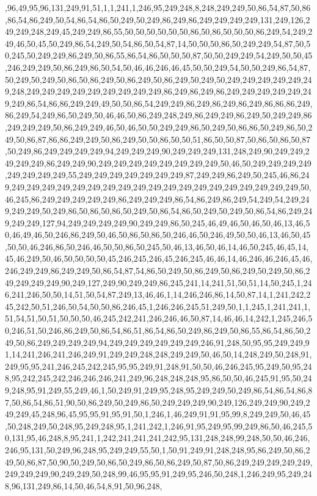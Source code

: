 ,96,49,95,96,131,249,91,51,1,1,241,1,246,95,249,248,8,248,249,249,50,86,54,87,50,86,86,54,86,249,50,54,86,54,86,50,249,50,249,86,249,86,249,249,249,249,131,249,126,249,249,248,249,45,249,249,86,55,50,50,50,50,50,50,86,50,86,50,50,50,86,249,54,249,249,46,50,45,50,249,86,54,249,50,54,86,50,54,87,14,50,50,50,86,50,249,249,54,87,50,50,245,50,249,249,86,249,50,86,55,86,54,86,50,50,50,87,50,50,249,249,54,249,50,50,45,246,249,249,50,86,249,86,50,54,50,46,46,246,46,45,50,50,249,54,50,50,249,86,54,87,50,249,50,249,50,86,50,86,249,50,86,249,50,86,249,50,249,50,249,249,249,249,249,249,248,249,249,249,249,249,249,249,249,249,86,249,86,249,86,249,249,249,249,249,249,249,86,54,86,86,249,249,49,50,50,86,54,249,249,86,249,86,249,86,249,86,86,86,249,86,249,54,249,86,50,249,50,46,46,50,86,249,248,249,86,249,249,86,249,50,249,249,86,249,249,249,50,86,249,249,46,50,46,50,50,249,249,86,50,249,50,86,86,50,249,86,50,249,50,86,87,86,86,249,249,50,86,249,50,50,86,50,50,51,86,50,50,87,50,86,50,86,50,87,50,249,86,249,249,249,249,94,249,249,249,90,249,249,249,131,248,249,90,249,249,249,249,249,86,249,249,90,249,249,249,249,249,249,249,249,50,46,50,249,249,249,249,249,249,249,249,55,249,249,249,249,249,249,249,87,249,249,86,249,50,245,46,86,249,249,249,249,249,249,249,249,249,249,249,249,249,249,249,249,249,249,249,249,50,46,245,86,249,249,249,249,249,86,249,249,249,86,54,86,249,86,249,54,249,54,249,249,249,249,50,249,86,50,86,50,86,50,249,50,86,54,86,50,249,50,249,50,86,54,86,249,249,249,249,127,94,249,249,249,249,90,249,249,86,50,245,46,49,46,50,46,50,46,13,46,50,46,49,46,50,246,86,249,50,46,50,86,50,86,50,246,46,50,246,49,50,50,46,13,46,50,45,50,50,46,246,86,50,246,46,50,50,86,50,245,50,46,13,46,50,46,14,46,50,245,46,45,14,45,46,249,50,46,50,50,50,50,45,246,245,246,45,246,245,46,46,14,46,246,46,246,45,46,246,249,249,86,249,249,50,86,54,87,54,86,50,249,50,86,249,50,86,249,50,249,50,86,249,249,249,249,90,249,127,249,90,249,249,86,245,241,14,241,51,50,51,14,50,245,1,246,241,246,50,50,14,51,50,54,87,249,13,46,46,1,14,246,246,86,14,50,87,14,1,241,242,245,242,50,51,246,50,54,50,50,86,246,45,1,246,246,245,51,249,50,1,1,245,1,241,241,1,51,54,51,50,51,50,50,50,46,245,242,241,246,246,46,50,87,14,46,46,14,242,1,245,246,50,246,51,50,246,86,249,50,86,54,86,51,86,54,86,50,249,86,249,50,86,55,86,54,86,50,249,50,86,249,249,249,249,94,249,249,249,249,249,249,246,91,248,50,95,95,249,249,91,14,241,246,241,246,249,91,249,249,248,248,249,249,50,46,50,14,248,249,50,248,91,249,95,95,241,246,245,242,245,95,95,249,91,248,91,50,50,46,246,245,95,249,50,95,248,95,242,245,242,246,246,246,241,249,96,248,248,248,95,86,50,50,46,245,91,95,50,249,248,95,91,249,55,249,46,1,50,249,91,249,95,248,95,249,249,50,249,86,54,86,54,86,87,50,86,54,86,51,90,50,86,249,50,249,86,50,249,249,249,90,249,126,249,249,90,249,249,249,45,248,96,45,95,95,91,95,91,50,1,246,1,46,249,91,91,95,99,8,249,249,50,46,45,50,248,249,50,248,95,249,248,95,1,241,242,1,246,91,95,249,95,99,249,86,50,46,245,50,131,95,46,248,8,95,241,1,242,241,241,241,242,95,131,248,248,99,248,50,50,46,246,246,95,131,50,249,96,248,95,249,249,55,50,1,50,91,249,91,248,248,95,86,249,50,86,249,50,86,87,50,90,50,249,50,86,50,249,86,50,86,249,50,87,50,86,249,249,249,249,249,249,249,249,90,249,249,50,248,99,46,95,95,91,249,95,246,50,248,1,246,249,95,249,248,96,131,249,86,14,50,46,54,8,91,50,96,248,
